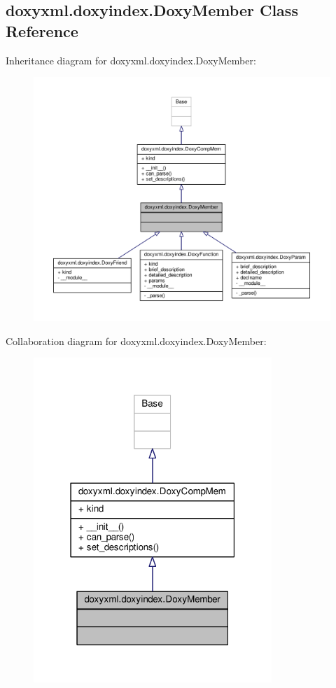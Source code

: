 \subsection{doxyxml.\+doxyindex.\+Doxy\+Member Class Reference}
\label{classdoxyxml_1_1doxyindex_1_1DoxyMember}


Inheritance diagram for doxyxml.\+doxyindex.\+Doxy\+Member\+:
\nopagebreak
\begin{figure}[H]
\begin{center}
\leavevmode
\includegraphics[width=350pt]{d7/dd6/classdoxyxml_1_1doxyindex_1_1DoxyMember__inherit__graph}
\end{center}
\end{figure}


Collaboration diagram for doxyxml.\+doxyindex.\+Doxy\+Member\+:
\nopagebreak
\begin{figure}[H]
\begin{center}
\leavevmode
\includegraphics[width=255pt]{d4/d94/classdoxyxml_1_1doxyindex_1_1DoxyMember__coll__graph}
\end{center}
\end{figure}
